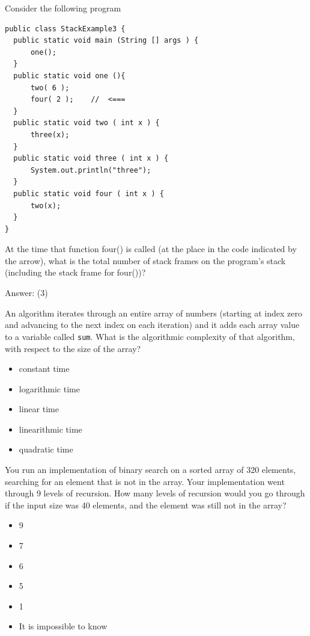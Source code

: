 \begin{question}
Consider the following program

\begin{lstlisting}
public class StackExample3 {
  public static void main (String [] args ) {
      one();
  }
  public static void one (){
      two( 6 );
      four( 2 );    //  <===
  }
  public static void two ( int x ) {
      three(x);
  }
  public static void three ( int x ) {
      System.out.println("three");
  }
  public static void four ( int x ) {
      two(x);
  }
}
\end{lstlisting}

At the time that function four() is called (at the place in the code indicated by the arrow), what is the total number of stack frames on the program's stack (including the stack frame for four())?

Answer: \underline{\hspace{1in}} \ifanswers (3)\fi
\end{question}

\begin{question}
An algorithm iterates through an entire array of numbers (starting at index zero and advancing to the next index on each iteration) and it adds each array value to a variable called \texttt{sum}. What is the algorithmic complexity of that algorithm, with respect to the size of the array?
\begin{itemize}[leftmargin=2em,itemsep=1pt,topsep=2pt]
\item[\cb{0}] constant time
\item[\cb{0}] logarithmic time
\item[\cb{1}] linear time
\item[\cb{0}] linearithmic time
\item[\cb{0}] quadratic time
\end{itemize}
\end{question}

\begin{question}
You run an implementation of binary search on a sorted array of 320 elements, searching for an element that is not in the array. Your implementation went through 9 levels of recursion.
How many levels of recursion would you go through if the input size was 40 elements, and the element was still not in the array?
\begin{itemize}[leftmargin=2em,itemsep=1pt,topsep=2pt]
\item[\cb{0}] 9
\item[\cb{0}] 7
\item[\cb{1}] 6
\item[\cb{0}] 5
\item[\cb{0}] 1
\item[\cb{0}] It is impossible to know
\end{itemize}
\end{question}


